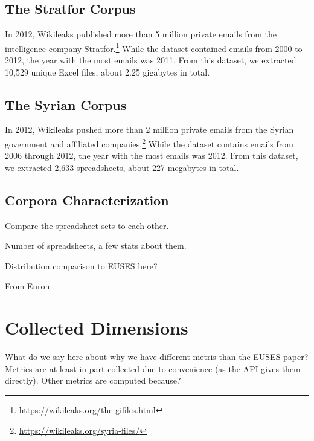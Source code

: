 \documentclass[conference]{IEEEtran}
\begin{document}
\subsection{The Stratfor Corpus}

In 2012, Wikileaks published more than 5 million private emails from the
intelligence company Stratfor.\footnote{\url{https://wikileaks.org/the-gifiles.html}}
While the dataset contained emails from 2000 to 2012, 
the year with the most emails was 2011.
From this dataset, we extracted 10,529 
unique Excel files, about 2.25 gigabytes in total.

\subsection{The Syrian Corpus}

In 2012, Wikileaks pushed more than 2 million private emails from
the Syrian government and affiliated companies.\footnote{\url{https://wikileaks.org/syria-files/}}
While the dataset contains emails from 2006 through 2012, 
the year with the most emails was 2012.
From this dataset, we extracted 2,633 spreadsheets, about 227 megabytes in total.

\subsection{Corpora Characterization}

Compare the spreadsheet sets to each other.

Number of spreadsheets, a few stats about them.

Distribution comparison to EUSES here?

From Enron:

\section{Collected Dimensions}

What do we say here about why we have different metris than the EUSES paper? Metrics are at least in part collected due to convenience (as the API gives them directly). Other metrics are computed because?
\end{document}
